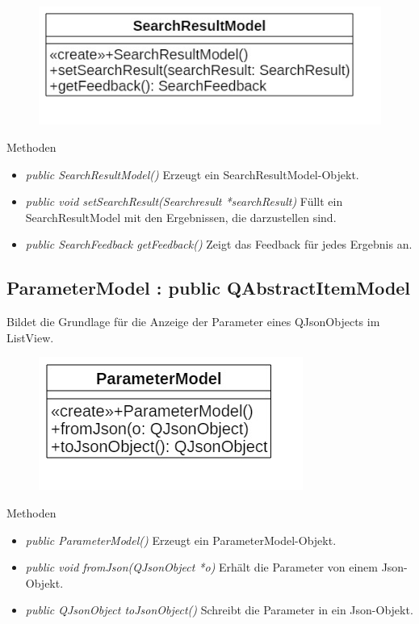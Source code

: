 \begin{figure}[H]
	\centering
	\includegraphics[scale=0.5]{img/Klassendiagramm/Klassen/View/SearchResultModel}
	\label{fig:searchResultModel}
\end{figure}

Methoden
\begin{itemize}
	\item\textit{public SearchResultModel()}
	Erzeugt ein SearchResultModel-Objekt.
	\item\textit{public void setSearchResult(Searchresult *searchResult)}
	Füllt ein SearchResultModel mit den Ergebnissen, die darzustellen sind.
	\item\textit{public SearchFeedback getFeedback()}
	Zeigt das Feedback für jedes Ergebnis an.
\end{itemize}

\subsection*{ParameterModel : public QAbstractItemModel}
Bildet die Grundlage für die Anzeige der Parameter eines QJsonObjects im ListView.

\begin{figure}[H]
	\centering
	\includegraphics[scale=0.5]{img/Klassendiagramm/Klassen/View/ParameterModel}
	\label{fig:parameterModel}
\end{figure}

Methoden
\begin{itemize}
	\item\textit{public ParameterModel()}
	Erzeugt ein ParameterModel-Objekt.
	\item\textit{public void fromJson(QJsonObject *o)}
	Erhält die Parameter von einem Json-Objekt.
	\item\textit{public QJsonObject toJsonObject()}
	Schreibt die Parameter in ein Json-Objekt.
\end{itemize}

